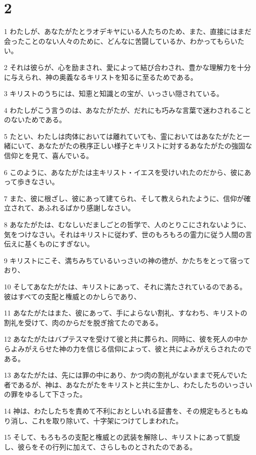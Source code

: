 \chapter{2}

\par 1 わたしが、あなたがたとラオデキヤにいる人たちのため、また、直接にはまだ会ったことのない人々のために、どんなに苦闘しているか、わかってもらいたい。
\par 2 それは彼らが、心を励まされ、愛によって結び合わされ、豊かな理解力を十分に与えられ、神の奥義なるキリストを知るに至るためである。
\par 3 キリストのうちには、知恵と知識との宝が、いっさい隠されている。
\par 4 わたしがこう言うのは、あなたがたが、だれにも巧みな言葉で迷わされることのないためである。
\par 5 たとい、わたしは肉体においては離れていても、霊においてはあなたがたと一緒にいて、あなたがたの秩序正しい様子とキリストに対するあなたがたの強固な信仰とを見て、喜んでいる。
\par 6 このように、あなたがたは主キリスト・イエスを受けいれたのだから、彼にあって歩きなさい。
\par 7 また、彼に根ざし、彼にあって建てられ、そして教えられたように、信仰が確立されて、あふれるばかり感謝しなさい。
\par 8 あなたがたは、むなしいだましごとの哲学で、人のとりこにされないように、気をつけなさい。それはキリストに従わず、世のもろもろの霊力に従う人間の言伝えに基くものにすぎない。
\par 9 キリストにこそ、満ちみちているいっさいの神の徳が、かたちをとって宿っており、
\par 10 そしてあなたがたは、キリストにあって、それに満たされているのである。彼はすべての支配と権威とのかしらであり、
\par 11 あなたがたはまた、彼にあって、手によらない割礼、すなわち、キリストの割礼を受けて、肉のからだを脱ぎ捨てたのである。
\par 12 あなたがたはバプテスマを受けて彼と共に葬られ、同時に、彼を死人の中からよみがえらせた神の力を信じる信仰によって、彼と共によみがえらされたのである。
\par 13 あなたがたは、先には罪の中にあり、かつ肉の割礼がないままで死んでいた者であるが、神は、あなたがたをキリストと共に生かし、わたしたちのいっさいの罪をゆるして下さった。
\par 14 神は、わたしたちを責めて不利におとしいれる証書を、その規定もろともぬり消し、これを取り除いて、十字架につけてしまわれた。
\par 15 そして、もろもろの支配と権威との武装を解除し、キリストにあって凱旋し、彼らをその行列に加えて、さらしものとされたのである。
